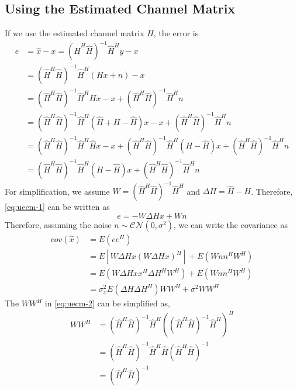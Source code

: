 \documentclass{article}
\begin{document}
\subsection{Using the Estimated Channel Matrix}
If we use the estimated channel matrix $H$, the error is
\begin{equation}
\begin{split}
e &= \hat{x} - x = (\hat{H}^H\hat{H})^{-1}\hat{H}^Hy - x \\
&=(\hat{H}^H\hat{H})^{-1}\hat{H}^H(Hx +n) - x \\
&=(\hat{H}^H\hat{H})^{-1}\hat{H}^HHx - x +  (\hat{H}^H\hat{H})^{-1}\hat{H}^Hn \\
&=(\hat{H}^H\hat{H})^{-1}\hat{H}^H(\hat{H} + H - \hat{H})x - x +  (\hat{H}^H\hat{H})^{-1}\hat{H}^Hn \\
&= (\hat{H}^H\hat{H})^{-1}\hat{H}^H\hat{H}x -x + (\hat{H}^H\hat{H})^{-1}\hat{H}^H(H - \hat{H})x +  (\hat{H}^H\hat{H})^{-1}\hat{H}^Hn \\
&= (\hat{H}^H\hat{H})^{-1}\hat{H}^H(H - \hat{H})x +  (\hat{H}^H\hat{H})^{-1}\hat{H}^Hn 
\end{split}
\label{eq:uecm-1}
\end{equation}
For simplification, we assume $W=(\hat{H}^H\hat{H})^{-1}\hat{H}^H$ and $\Delta H=\hat{H}-H$. Therefore, \eqref{eq:uecm-1} can be written as 
\begin{equation}
e = - W\Delta Hx + Wn
\end{equation}
Therefore, assuming the noise $n \sim \mathcal{CN}(0, \sigma^2)$, we can write the covariance as
\begin{equation}
\begin{split}
cov(\hat{x}) &= E(ee^H) \\
&= E[W\Delta Hx(W\Delta Hx)^H] + E(Wnn^HW^H) \\
&= E(W\Delta Hxx^H\Delta H^HW^H) + E(Wnn^HW^H) \\
&= \sigma_x^2E(\Delta H\Delta H^H)WW^H + \sigma^2WW^H
\end{split}
\label{eq:uecm-2}
\end{equation}
The $WW^H$ in \eqref{eq:uecm-2} can be simplified as,
\begin{equation}
\begin{split}
WW^H &= (\hat{H}^H\hat{H})^{-1}\hat{H}^H ((\hat{H}^H\hat{H})^{-1}\hat{H}^H)^H\\
&= (\hat{H}^H\hat{H})^{-1}\hat{H}^H \hat{H}(\hat{H}^H\hat{H})^{-1} \\
&= (\hat{H}^H\hat{H})^{-1}
\end{split}
\end{equation}
\end{document}
